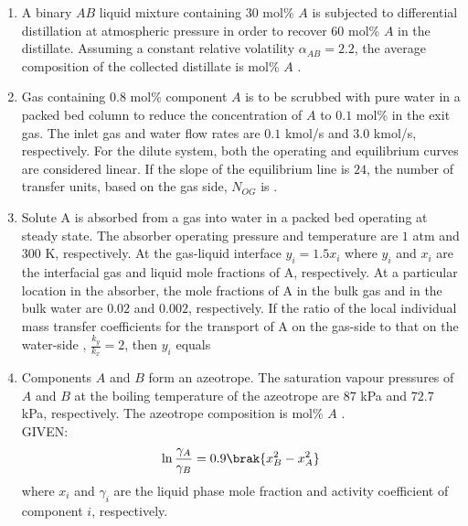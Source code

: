 \documentclass[journal,12pt,onecolumn]{IEEEtran}
\theoremstyle{remark}
\begin{document}
\begin{enumerate}
		\hfill{}
		
		\item A binary $AB$ liquid mixture containing $30$ mol\% $A$ is subjected to differential  distillation at atmospheric pressure in order to recover $60$ mol\% $A$ in the distillate. Assuming a constant relative volatility $\alpha_{AB} = 2.2$, the average composition of the collected distillate is \underline{\hspace{2cm}} mol\% $A$ .
		
		\hfill{}
		
		\item Gas containing $0.8$ mol\% component $A$ is to be scrubbed with pure water in a packed bed column to reduce the concentration of $A$ to $0.1$ mol\% in the exit gas. The inlet gas and water flow rates are $0.1$ kmol/s and $3.0$ kmol/s, respectively. For the dilute system, both the operating and equilibrium curves are considered linear. If the slope of the equilibrium line is $24$, the number of transfer units, based on the gas side, $N_{OG}$ is \underline{\hspace{2cm}} .
		
		\hfill{}
		
		\item Solute A is absorbed from a gas into water in a packed bed operating at steady state. The absorber operating pressure and temperature are $1$ atm and $300$ K, respectively. At the gas-liquid interface $y_i = 1.5 x_i$ where $y_i$ and $x_i$ are the interfacial gas and liquid mole fractions of A, respectively. At a particular location in the absorber, the mole fractions of A in the bulk gas and in the bulk water are $0.02$ and $0.002$, respectively. If the ratio of the local individual mass transfer coefficients for the transport of A on the gas-side  to that on the water-side , $\frac{k_y}{k_x} = 2$, then $y_i$ equals \underline{\hspace{2cm}} 
		
		\hfill{}
		
		\item Components $A$ and $B$ form an azeotrope. The saturation vapour pressures of $A$ and $B$ at the boiling temperature of the azeotrope are $87$ kPa and $72.7$ kPa, respectively. The azeotrope composition is \underline{\hspace{2cm}} mol\% $A$ . \\
		GIVEN:
		\[ \ln\frac{\gamma_A}{\gamma_B} = 0.9\brak{x_B^2 - x_A^2} \]
		where $x_i$ and $\gamma_i$ are the liquid phase mole fraction and activity coefficient of component $i$, respectively.
		

\end{enumerate}
\end{document}
